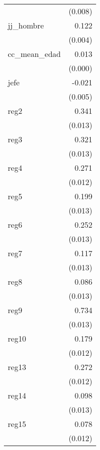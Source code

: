 {\begin{longtable}{l*{1}{D{.}{.}{-1}}}
            &     (0.008)         \\
\addlinespace
jj\_hombre   &       0.122\sym{***}\\
            &     (0.004)         \\
\addlinespace
cc\_mean\_edad&       0.013\sym{***}\\
            &     (0.000)         \\
\addlinespace
jefe        &      -0.021\sym{***}\\
            &     (0.005)         \\
\addlinespace
reg2        &       0.341\sym{***}\\
            &     (0.013)         \\
\addlinespace
reg3        &       0.321\sym{***}\\
            &     (0.013)         \\
\addlinespace
reg4        &       0.271\sym{***}\\
            &     (0.012)         \\
\addlinespace
reg5        &       0.199\sym{***}\\
            &     (0.013)         \\
\addlinespace
reg6        &       0.252\sym{***}\\
            &     (0.013)         \\
\addlinespace
reg7        &       0.117\sym{***}\\
            &     (0.013)         \\
\addlinespace
reg8        &       0.086\sym{***}\\
            &     (0.013)         \\
\addlinespace
reg9        &       0.734\sym{***}\\
            &     (0.013)         \\
\addlinespace
reg10       &       0.179\sym{***}\\
            &     (0.012)         \\
\addlinespace
reg13       &       0.272\sym{***}\\
            &     (0.012)         \\
\addlinespace
reg14       &       0.098\sym{***}\\
            &     (0.013)         \\
\addlinespace
reg15       &       0.078\sym{***}\\
            &     (0.012)         \\

\end{longtable}}
